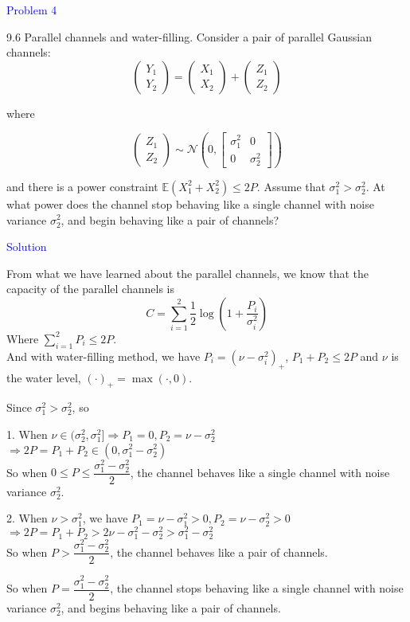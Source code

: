 \textcolor{blue}{Problem 4}

9.6 Parallel channels and water-filling. Consider a pair of parallel Gaussian channels:
$$\left(\begin{array}{c}Y_1 \\ Y_2 \end{array}\right)=\left(\begin{array}{c}X_1 \\ X_2 \end{array}\right)+\left(\begin{array}{c}Z_1 \\ Z_2 \end{array}\right)$$

where

$$\left(\begin{array}{c}Z_1 \\ Z_2 \end{array}\right) \sim \mathcal{N}\left(0,\left[\begin{array}{cc}
\sigma_1^2 & 0 \\
0 & \sigma_2^2
\end{array}\right]\right)$$

and there is a power constraint $\mathbb{E}\left(X_1^2+X_2^2\right) \leq 2 P$. Assume that $\sigma_1^2>\sigma_2^2$. At what power does the channel stop behaving like a single channel with noise variance $\sigma_2^2$, and begin behaving like a pair of channels?

\textcolor{blue}{Solution}

From what we have learned about the parallel channels, we know that the capacity of the parallel channels is
$$C=\sum_{i=1}^2\dfrac{1}{2}\log\left(1+\dfrac{P_i}{\sigma_i^2}\right)$$
Where $\sum\limits_{i=1}^2P_i\leq 2P$. \\
And with water-filling method, we have $P_i=\left(\nu-\sigma_i^2\right)_+$, $P_1+P_2\leq 2P$ and $\nu$ is the water level, $(\cdot)_+=\max(\cdot, 0)$.

Since $\sigma_1^2>\sigma_2^2$, so

1. When $\nu\in(\sigma_2^2,\sigma_1^2]\Rightarrow P_1=0,P_2=\nu-\sigma_2^2$ \\
$\Rightarrow 2P=P_1+P_2\in(0,\sigma_1^2-\sigma_2^2)$ \\
So when $0\leq P\leq \dfrac{\sigma_1^2-\sigma_2^2}{2}$, the channel behaves like a single channel with noise variance $\sigma_2^2$.

2. When $\nu>\sigma_1^2$, we have $P_1=\nu-\sigma_1^2>0,P_2=\nu-\sigma_2^2>0$ \\
$\Rightarrow 2P=P_1+P_2>2\nu-\sigma_1^2-\sigma_2^2>\sigma_1^2-\sigma_2^2$ \\
So when $P>\dfrac{\sigma_1^2-\sigma_2^2}{2}$, the channel behaves like a pair of channels.

So when $P=\dfrac{\sigma_1^2-\sigma_2^2}{2}$, the channel stops behaving like a single channel with noise variance $\sigma_2^2$, and begins behaving like a pair of channels.

\newpage